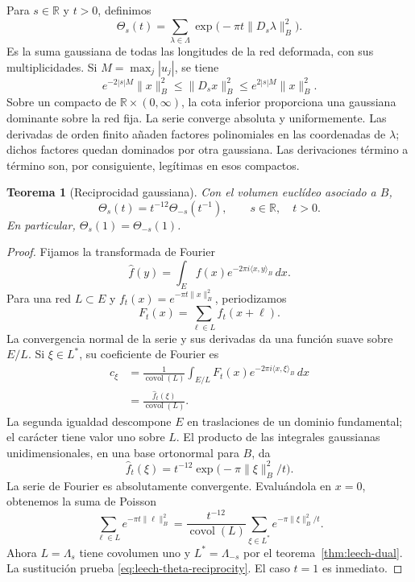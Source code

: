 \documentclass[a4paper,10pt]{article}
\newtheorem{theorem}{Teorema}[section]
\theoremstyle{definition}\newtheorem{definition}[theorem]{Definición}
\theoremstyle{remark}\newtheorem{remark}[theorem]{Observación}
\numberwithin{equation}{section}
\begin{document}
Para \(s\in\mathbb R\) y \(t>0\), definimos
\begin{equation}
 \Theta_s(t)=\sum_{\lambda\in\Lambda}
                \exp\bigl(-\pi t\|D_s\lambda\|_B^2\bigr).
 \label{eq:leech-theta-real}
\end{equation}
Es la suma gaussiana de todas las longitudes de la red deformada,
con sus multiplicidades. Si \(M=\max_j|u_j|\), se tiene
\begin{equation}
 e^{-2|s|M}\|x\|_B^2
 \leq\|D_sx\|_B^2
 \leq e^{2|s|M}\|x\|_B^2.
 \label{eq:leech-quadratic-bounds}
\end{equation}
Sobre un compacto de \(\mathbb R\times(0,\infty)\), la cota
inferior proporciona una gaussiana dominante sobre la red fija.
La serie converge absoluta y uniformemente. Las derivadas de
orden finito añaden factores polinomiales en las coordenadas de
\(\lambda\); dichos factores quedan dominados por otra gaussiana.
Las derivaciones término a término son, por consiguiente,
legítimas en esos compactos.

\begin{theorem}[Reciprocidad gaussiana]
\label{thm:leech-theta}
Con el volumen euclídeo asociado a \(B\),
\begin{equation}
 \Theta_s(t)=t^{-12}\Theta_{-s}(t^{-1}),
 \qquad s\in\mathbb R,\quad t>0.
 \label{eq:leech-theta-reciprocity}
\end{equation}
En particular, \(\Theta_s(1)=\Theta_{-s}(1)\).
\end{theorem}
\begin{proof}
Fijamos la transformada de Fourier
\[
 \widehat f(y)=\int_E
      f(x)e^{-2\pi i\langle x,y\rangle_B}\,dx.
\]
Para una red \(L\subset E\) y
\(f_t(x)=e^{-\pi t\|x\|_B^2}\), periodizamos
\[
 F_t(x)=\sum_{\ell\in L}f_t(x+\ell).
\]
La convergencia normal de la serie y sus derivadas da una función
suave sobre \(E/L\). Si \(\xi\in L^*\), su coeficiente de Fourier es
\[
\begin{split}
 c_\xi
 &=\frac1{\operatorname{covol}(L)}
   \int_{E/L}F_t(x)e^{-2\pi i\langle x,\xi\rangle_B}\,dx\\
 &=\frac{\widehat f_t(\xi)}{\operatorname{covol}(L)}.
\end{split}
\]
La segunda igualdad descompone \(E\) en traslaciones de un dominio
fundamental; el carácter tiene valor uno sobre \(L\). El producto
de las integrales gaussianas unidimensionales, en una base
ortonormal para \(B\), da
\[
 \widehat f_t(\xi)=
 t^{-12}\exp\bigl(-\pi\|\xi\|_B^2/t\bigr).
\]
La serie de Fourier es absolutamente convergente. Evaluándola en
\(x=0\), obtenemos la suma de Poisson
\[
 \sum_{\ell\in L}e^{-\pi t\|\ell\|_B^2}
 =\frac{t^{-12}}{\operatorname{covol}(L)}
      \sum_{\xi\in L^*}e^{-\pi\|\xi\|_B^2/t}.
\]
Ahora \(L=\Lambda_s\) tiene covolumen uno y
\(L^*=\Lambda_{-s}\) por el teorema~\ref{thm:leech-dual}.
La sustitución prueba \eqref{eq:leech-theta-reciprocity}.
El caso \(t=1\) es inmediato.
\end{proof}
\end{document}
